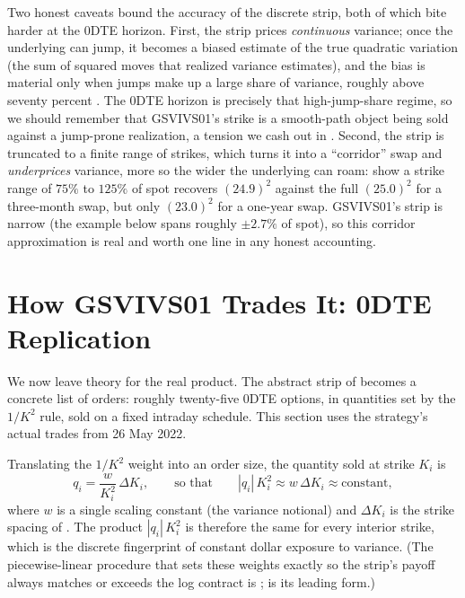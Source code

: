 Two honest caveats bound the accuracy of the discrete strip, both of which bite harder at the 0DTE horizon. First, the strip prices \emph{continuous} variance; once the underlying can jump, it becomes a biased estimate of the true quadratic variation (the sum of squared moves that realized variance estimates), and the bias is material only when jumps make up a large share of variance, roughly above seventy percent \citep{DuKapadia2012}. The 0DTE horizon is precisely that high-jump-share regime, so we should remember that GSVIVS01's strike is a smooth-path object being sold against a jump-prone realization, a tension we cash out in . Second, the strip is truncated to a finite range of strikes, which turns it into a ``corridor'' swap and \emph{underprices} variance, more so the wider the underlying can roam: \citet[Table~4, p.~28]{Demeterfi1999} show a strike range of $75\%$ to $125\%$ of spot recovers $(24.9)^2$ against the full $(25.0)^2$ for a three-month swap, but only $(23.0)^2$ for a one-year swap. GSVIVS01's strip is narrow (the example below spans roughly $\pm 2.7\%$ of spot), so this corridor approximation is real and worth one line in any honest accounting.

\section{How GSVIVS01 Trades It: 0DTE Replication}
\label{sec:gsvivs:replication}

We now leave theory for the real product. The abstract strip of  becomes a concrete list of orders: roughly twenty-five 0DTE options, in quantities set by the $1/K^2$ rule, sold on a fixed intraday schedule. This section uses the strategy's actual trades from 26 May 2022.

Translating the $1/K^2$ weight into an order size, the quantity sold at strike $K_i$ is
\begin{equation}
\label{eq:gsvivs:quantity}
q_i = \frac{w}{K_i^2}\,\Delta K_i,
\qquad\text{so that}\qquad |q_i|\,K_i^2 \approx w\,\Delta K_i \approx \text{constant},
\end{equation}
where $w$ is a single scaling constant (the variance notional) and $\Delta K_i$ is the strike spacing of . The product $|q_i|\,K_i^2$ is therefore the same for every interior strike, which is the discrete fingerprint of constant dollar exposure to variance. (The piecewise-linear procedure that sets these weights exactly so the strip's payoff always matches or exceeds the log contract is \citet[App.~A, Eqs.~A5--A8]{Demeterfi1999};  is its leading form.)

